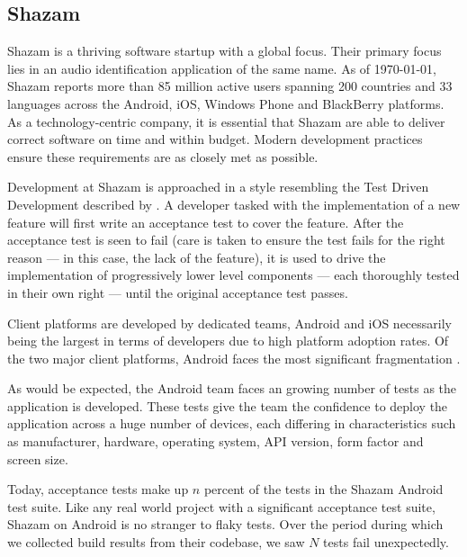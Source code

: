 

\subsection{Shazam}

Shazam is a thriving software startup with a global focus. Their primary focus
lies in an audio identification application of the same name. As of \today,
Shazam reports more than 85 million active users spanning 200 countries and 33
languages across the Android, iOS, Windows Phone and BlackBerry platforms. As a
technology-centric company, it is essential that Shazam are able to deliver
correct software on time and within budget. Modern development practices ensure
these requirements are as closely met as possible.

Development at Shazam is approached in a style resembling the Test Driven
Development described by \citet*{freeman2009growing}. A developer tasked with
the implementation of a new feature will first write an acceptance test to cover
the feature. After the acceptance test is seen to fail (care is taken to ensure
the test fails for the right reason --- in this case, the lack of the feature),
it is used to drive the implementation of progressively lower level components
--- each thoroughly tested in their own right --- until the original acceptance
test passes.

Client platforms are developed by dedicated teams, Android and iOS necessarily
being the largest in terms of developers due to high platform adoption rates. Of
the two major client platforms, Android faces the most significant fragmentation
\cite{AndroidFragmentationVisualized}.

As would be expected, the Android team faces an growing number of tests as the
application is developed.  These tests give the team the confidence to deploy the
application across a huge number of devices, each differing in characteristics
such as manufacturer, hardware, operating system, API version, form factor and
screen size.

Today, acceptance tests make up $n$ percent of the tests in the Shazam Android
test suite. Like any real world project with a significant acceptance test
suite, Shazam on Android is no stranger to flaky tests. Over the period
 during which we collected build results
from their codebase, we saw $N$ tests fail unexpectedly.


